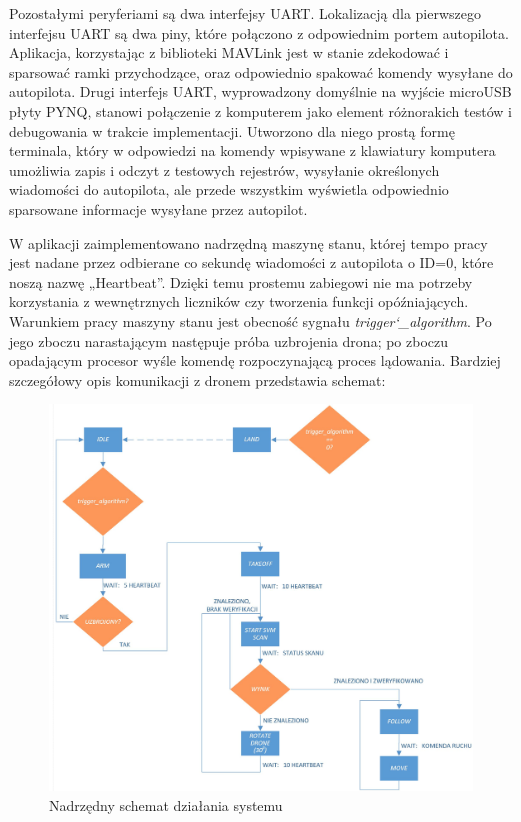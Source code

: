 Pozostałymi peryferiami są dwa interfejsy UART. Lokalizacją dla pierwszego interfejsu UART są dwa piny, które połączono z odpowiednim portem autopilota. Aplikacja, korzystając z biblioteki MAVLink jest w stanie zdekodować i sparsować ramki przychodzące, oraz odpowiednio spakować komendy wysyłane do autopilota.
\newline Drugi interfejs UART, wyprowadzony domyślnie na wyjście microUSB płyty PYNQ, stanowi połączenie z komputerem jako element różnorakich testów i debugowania w trakcie implementacji. Utworzono dla niego prostą formę terminala, który w odpowiedzi na komendy wpisywane z klawiatury komputera umożliwia zapis i odczyt z testowych rejestrów, wysyłanie określonych wiadomości do autopilota, ale przede wszystkim wyświetla odpowiednio sparsowane informacje wysyłane przez autopilot.

W aplikacji zaimplementowano nadrzędną maszynę stanu, której tempo pracy jest nadane przez odbierane co sekundę wiadomości z autopilota o ID=0, które noszą nazwę „Heartbeat”. Dzięki temu prostemu zabiegowi nie ma potrzeby korzystania z wewnętrznych liczników czy tworzenia funkcji opóźniających. Warunkiem pracy maszyny stanu jest obecność sygnału \textit{trigger\char`_algorithm}. Po jego zboczu narastającym następuje próba uzbrojenia drona; po zboczu opadającym procesor wyśle komendę rozpoczynającą proces lądowania. Bardziej szczegółowy opis komunikacji z dronem przedstawia schemat:

\begin{figure}[h]
	\centering
	\includegraphics[width=16cm]{5_PS_FSM.jpg}
	\caption{Nadrzędny schemat działania systemu}
	\label{fig:PL_FSM_sch}
\end{figure}

